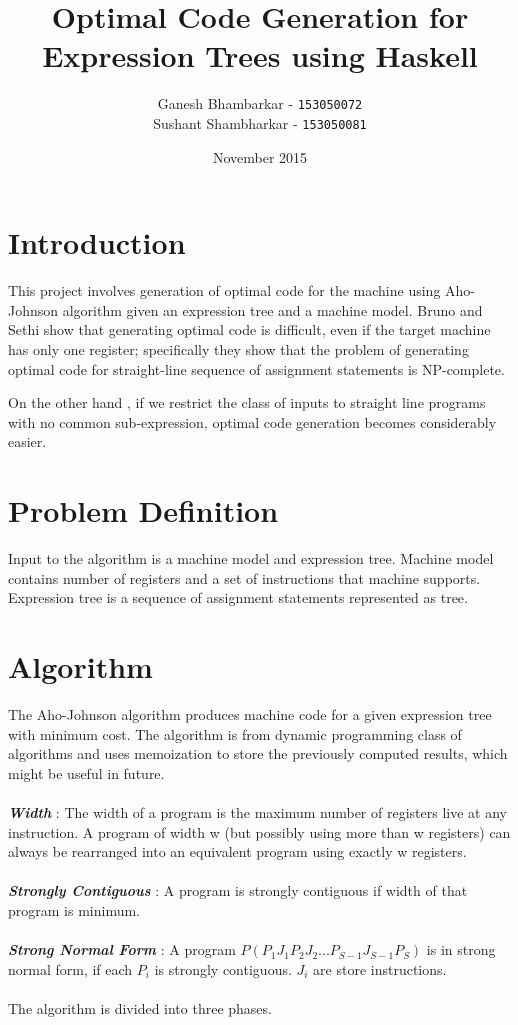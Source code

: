 \documentclass{article}
\title{Optimal Code Generation for Expression Trees using Haskell}
\author{Ganesh Bhambarkar - \texttt{153050072}
\\ Sushant Shambharkar - \texttt{153050081}}
\date{November 2015}
\begin{document}
\maketitle

\section{Introduction}  
This project involves generation of optimal code for  the machine using Aho-Johnson algorithm given an expression tree and a machine model. Bruno and Sethi show that generating optimal code is difficult, even if the target machine has only one register; specifically they show that the problem of generating optimal code for straight-line sequence of assignment statements is NP-complete.\citep{Aho:1976:OCG:321958.321970} 

On the other hand , if we restrict the class of inputs to straight line programs with no common sub-expression, optimal code generation becomes considerably easier.\citep{Aho:1976:OCG:321958.321970}  

\section{Problem Definition}
Input to the algorithm is a machine model and expression tree. Machine model contains number of registers and a set of instructions that machine supports. Expression tree is a sequence of assignment statements represented as tree.

\section{Algorithm}  
The Aho-Johnson algorithm produces machine code for a given expression tree with minimum cost. The algorithm is from dynamic programming class of algorithms and uses memoization to store the previously computed results, which might be useful in future.\\\\
\textbf{\emph{Width}} : The width of a program is the maximum number of registers live at any instruction. A program of width w (but possibly using more than w registers) can always be rearranged into an equivalent program using exactly w registers.\citep{sanyalcode}\\\\
\textbf{\emph{Strongly Contiguous}} : A program is strongly contiguous if width of that program is minimum.\\\\
\textbf{\emph{Strong Normal Form}} : A program $P(P_1J_1P_2J_2...P_{S-1}J_{S-1}P_S)$ is in strong normal form, if each $P_i$ is strongly contiguous. $J_i$ are store instructions.\citep{sanyalcode}\\\\
The algorithm is divided into three phases.
\end{document}
